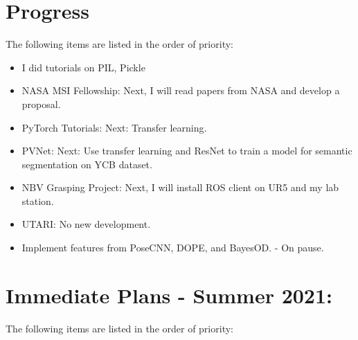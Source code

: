 \documentclass[11pt]{article}
\begin{document}
\section{Progress}
The following items are listed in the order of priority:
\begin{itemize}
      \item I did tutorials on PIL, Pickle
      \item NASA MSI Fellowship: Next, I will read papers from NASA
      \cite{NASATech44:online} and develop a proposal.
      \item PyTorch Tutorials: Next: Transfer learning.
      \item PVNet: Next: Use transfer learning and ResNet to train a model for
      semantic segmentation on YCB dataset.
      \item NBV Grasping Project: Next, I will install ROS client on UR5 and
      my lab station.
      \item UTARI: No new development.
      \item Implement features from PoseCNN, DOPE, and BayesOD. - On pause.
\end{itemize}


\section{Immediate Plans - Summer 2021:}
The following items are listed in the order of priority:
\end{document}
